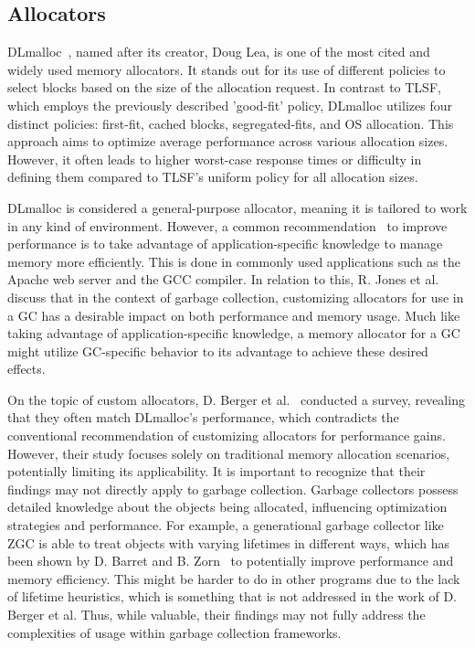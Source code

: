 
\subsection{Allocators}

DLmalloc~\cite{dlmalloc}, named after its creator, Doug Lea, is one of the most cited and widely used memory allocators. It stands out for its use of different policies to select blocks based on the size of the allocation request. In contrast to TLSF, which employs the previously described 'good-fit' policy, DLmalloc utilizes four distinct policies: first-fit, cached blocks, segregated-fits, and OS allocation. This approach aims to optimize average performance across various allocation sizes. However, it often leads to higher worst-case response times or difficulty in defining them compared to TLSF's uniform policy for all allocation sizes.

DLmalloc is considered a general-purpose allocator, meaning it is tailored to work in any kind of environment. However, a common recommendation~\cite{custom_rec_1, custom_rec_2} to improve performance is to take advantage of application-specific knowledge to manage memory more efficiently. This is done in commonly used applications such as the Apache web server and the GCC compiler. In relation to this, R. Jones et al.~\cite{gchandbook} discuss that in the context of garbage collection, customizing allocators for use in a GC has a desirable impact on both performance and memory usage. Much like taking advantage of application-specific knowledge, a memory allocator for a GC might utilize GC-specific behavior to its advantage to achieve these desired effects.

On the topic of custom allocators, D. Berger et al.~\cite{slow_custom_allocators} conducted a survey, revealing that they often match DLmalloc's performance, which contradicts the conventional recommendation of customizing allocators for performance gains. However, their study focuses solely on traditional memory allocation scenarios, potentially limiting its applicability. It is important to recognize that their findings may not directly apply to garbage collection. Garbage collectors possess detailed knowledge about the objects being allocated, influencing optimization strategies and performance. For example, a generational garbage collector like ZGC is able to treat objects with varying lifetimes in different ways, which has been shown by D. Barret and B. Zorn~\cite{lifetime_predictors_memalloc} to potentially improve performance and memory efficiency. This might be harder to do in other programs due to the lack of lifetime heuristics, which is something that is not addressed in the work of D. Berger et al. Thus, while valuable, their findings may not fully address the complexities of usage within garbage collection frameworks.

